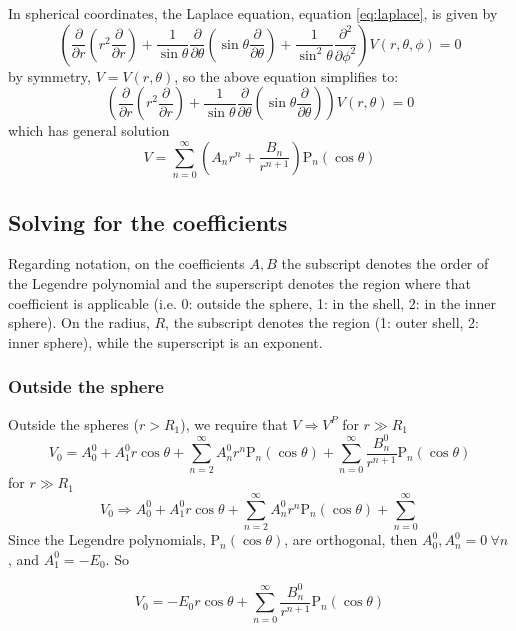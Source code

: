In spherical coordinates, the Laplace equation, equation \ref{eq:laplace}, is given by
    $$
    \left(\frac{\partial}{\partial r}\left(r^2 \frac{\partial}{\partial r}\right)
    + \frac{1}{\sin \theta}\frac{\partial}{\partial \theta}\left(\sin\theta\frac{\partial}{\partial \theta}\right)
    + \frac{1}{\sin^2\theta} \frac{\partial^2}{\partial \phi^2} \right) V(r,\theta,\phi) = 0
    $$
by symmetry, $V = V(r,\theta)$, so the above equation simplifies to:
    \begin{equation}
    \left(\frac{\partial}{\partial r}\left(r^2 \frac{\partial}{\partial r}\right)
    + \frac{1}{\sin \theta}\frac{\partial}{\partial \theta}\left(\sin\theta\frac{\partial}{\partial \theta}\right)\right) V(r,\theta) = 0
    \label{eq:laplaceSphere}
    \end{equation}
which has general solution
    \begin{equation}
    V = \sum_{n = 0}^{\infty}\left(A_nr^n + \frac{B_n}{r^{n+1}}\right)\text{P}_n(\cos\theta)
    \label{eq:laplaceSphereSoln}
    \end{equation}

\subsection{Solving for the coefficients}

Regarding notation, on the coefficients $A,B$ the subscript denotes the order of the Legendre polynomial and the superscript denotes the region where that coefficient is applicable (i.e. 0: outside the sphere, 1: in the shell, 2: in the inner sphere). On the radius, $R$, the subscript denotes the region (1: outer shell, 2: inner sphere), while the superscript is an exponent.

\subsubsection{Outside the sphere}
Outside the spheres ($r>R_1$), we require that $V\Rightarrow V^P$ for $r \gg R_1$
    $$
    V_0
    = A_0^0
    + A_1^0 r\cos\theta
    + \sum_{n=2}^{\infty} A_n^0 r^n \text{P}_n(\cos\theta)
    + \sum_{n=0}^{\infty} \frac{B_n^0}{r^{n+1}} \text{P}_n(\cos\theta)
    $$
for $r \gg R_1$
    $$
    V_0
    \Rightarrow A_0^0
    + A_1^0 r\cos\theta
    + \sum_{n=2}^{\infty} A_n^0 r^n \text{P}_n(\cos\theta)
    + \sum_{n=0}^{\infty}
    $$
Since the Legendre polynomials, $\text{P}_n(\cos\theta)$, are orthogonal, then $A_0^0, A_n^0 = 0 ~ \forall n$, and $A_1^0 = -E_0$. So
    \begin{mdframed}[backgroundcolor=gray!10, innertopmargin=0pt, innerbottommargin=10pt]
        \begin{equation}
    V_0
    = -E_0 r \cos\theta
    + \sum_{n=0}^{\infty} \frac{B_n^0}{r^{n+1}} \text{P}_n(\cos\theta)
    \label{eq:V0}
    \end{equation}
    \end{mdframed}


